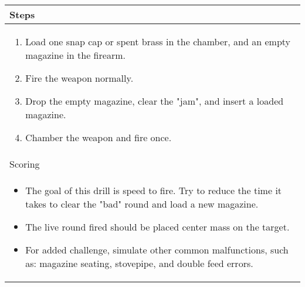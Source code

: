 \documentclass[../Cover.tex]{subfiles}
\begin{document}
	\begin{tabular}{ | p{} |}
		\hline
		\rowcolor[HTML]{C0C0C0}Steps\\ 
		\hline
		\tiny \begin{enumerate}[topsep=0pt, partopsep=0pt]
			\item Load one snap cap or spent brass in the chamber, and an empty magazine in the firearm.
			\item Fire the weapon normally.
			\item Drop the empty magazine, clear the "jam", and insert a loaded magazine.
			\item Chamber the weapon and fire once.
		\end{enumerate}		
		\\ [0.25\textheight]
		\hline
		\rowcolor[HTML]{C0C0C0}Scoring \\
		\hline
		\tiny \begin{itemize}[topsep=0pt, partopsep=0pt]
			\item The goal of this drill is speed to fire. Try to reduce the time it takes to clear the "bad" round and load a new magazine.
			\item The live round fired should be placed center mass on the target.
			\item For added challenge, simulate other common malfunctions, such as: magazine seating, stovepipe, and double feed errors.
		\end{itemize}		
		\\ [0.25\textheight]
		\hline
	\end{tabular}
\end{document}
